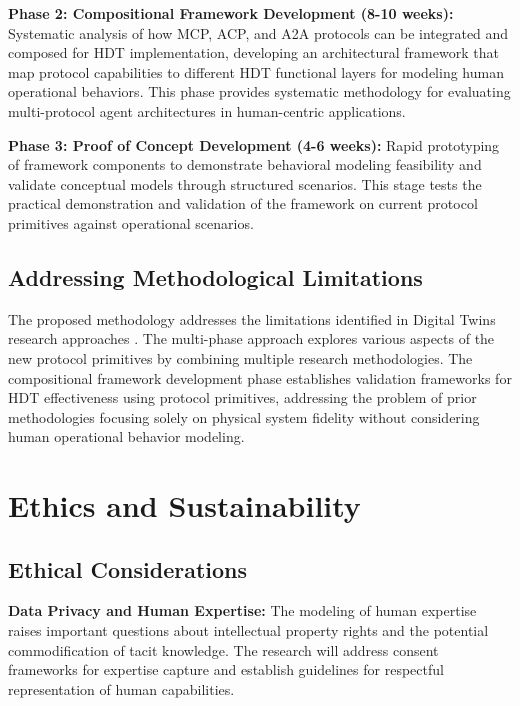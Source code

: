 \documentclass[12pt,a4paper]{article}
\begin{document}
\textbf{Phase 2: Compositional Framework Development (8-10 weeks):} Systematic analysis of how MCP, ACP, and A2A protocols can be integrated and composed for HDT implementation, developing an architectural framework that map protocol capabilities to different HDT functional layers for modeling human operational behaviors. This phase provides systematic methodology for evaluating multi-protocol agent architectures in human-centric applications.

\textbf{Phase 3: Proof of Concept Development (4-6 weeks):} Rapid prototyping of framework components to demonstrate behavioral modeling feasibility and validate conceptual models through structured scenarios. This stage tests the practical demonstration and validation of the framework on current protocol primitives against operational scenarios.

\subsection{Addressing Methodological Limitations}

The proposed methodology addresses the limitations identified in Digital Twins research approaches \cite{10.1186/s10033-024-00998-7} \cite{10.1016/j.ifacol.2022.09.675}. The multi-phase approach explores various aspects of the new protocol primitives by combining multiple research methodologies. The compositional framework development phase establishes validation frameworks for HDT effectiveness using protocol primitives, addressing the problem of prior methodologies focusing solely on physical system fidelity without considering human operational behavior modeling.

\section{Ethics and Sustainability}
\label{sec:ethics}

\subsection{Ethical Considerations}

\noindent \textbf{Data Privacy and Human Expertise:} The modeling of human expertise raises important questions about intellectual property rights and the potential commodification of tacit knowledge. The research will address consent frameworks for expertise capture and establish guidelines for respectful representation of human capabilities.
\end{document}

